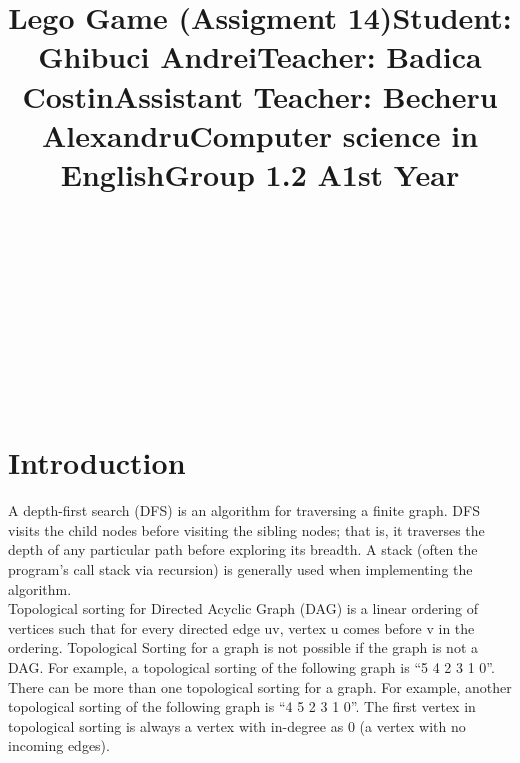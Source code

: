\documentclass[14pt]{article}
\begin{document}
\title{\huge Lego Game (Assigment 14)}
\maketitle
\begin{center}
\vspace{30 mm}

\title{\huge Student: Ghibuci Andrei}
\\\vspace{10 mm}
\title{\huge Teacher: Badica Costin}
\\\vspace{10 mm}
\title{\huge Assistant Teacher: Becheru Alexandru}
\\\vspace{10 mm}
\title{\huge Computer science in English}
\\\vspace{10 mm}
\title{\huge Group 1.2 A}
\\\vspace{10 mm}
\title{\huge 1st Year}
\maketitle

\newpage
\section*{Introduction}
\vspace{20 mm}
A depth-first search (DFS) is an algorithm for traversing a finite graph. DFS visits the child nodes before visiting the sibling nodes; that is, it traverses the depth of any particular path before exploring its breadth. A stack (often the program's call stack via recursion) is generally used when implementing the algorithm.
\\\vspace{10 mm}
Topological sorting for Directed Acyclic Graph (DAG) is a linear ordering of vertices such that for every directed edge uv, vertex u comes before v in the ordering. Topological Sorting for a graph is not possible if the graph is not a DAG.
For example, a topological sorting of the following graph is “5 4 2 3 1 0”. There can be more than one topological sorting for a graph. For example, another topological sorting of the following graph is “4 5 2 3 1 0”. The first vertex in topological sorting is always a vertex with in-degree as 0 (a vertex with no incoming edges).

\newpage
\end{center}
\end{document}

